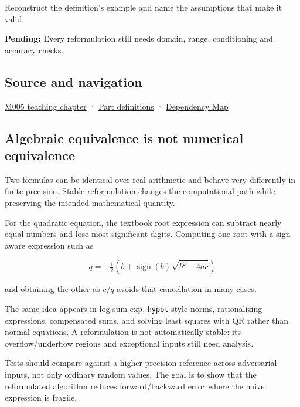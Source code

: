 Reconstruct the definition's example and name the assumptions that make it valid.

\textbf{Pending:} Every reformulation still needs domain, range, conditioning and accuracy checks.

\subsection{Source and navigation}\label{appendix-d7f8ba961670-source-and-navigation}

\hyperref[01-foundations-i-ch001-when-arithmetic-meets-uncertainty]{M005 teaching chapter} · \hyperref[appendix-fd090d982a15-m005---parts-77-88]{Part definitions} · \hyperref[appendix-4ad47bdd269a]{Dependency Map}

\subsection{Algebraic equivalence is not numerical equivalence}\label{appendix-d7f8ba961670-algebraic-equivalence-is-not-numerical-equivalence}

Two formulas can be identical over real arithmetic and behave very differently in finite precision. Stable reformulation changes the computational path while preserving the intended mathematical quantity.

For the quadratic equation, the textbook root expression can subtract nearly equal numbers and lose most significant digits. Computing one root with a sign-aware expression such as

\[
q=-\tfrac12\left(b+\operatorname{sign}(b)\sqrt{b^2-4ac}\right)
\]

and obtaining the other as \(c/q\) avoids that cancellation in many cases.

The same idea appears in log-sum-exp, \texttt{hypot}-style norms, rationalizing expressions, compensated sums, and solving least squares with QR rather than normal equations. A reformulation is not automatically stable: its overflow/underflow regions and exceptional inputs still need analysis.

Tests should compare against a higher-precision reference across adversarial inputs, not only ordinary random values. The goal is to show that the reformulated algorithm reduces forward/backward error where the naive expression is fragile.
